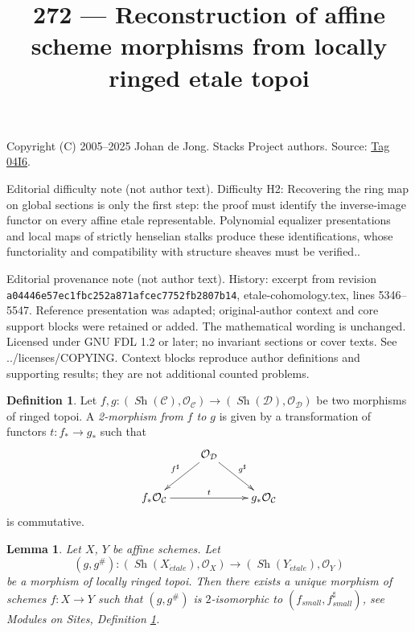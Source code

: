 \documentclass{amsart}
\theoremstyle{plain}
\newtheorem{lemma}[subsection]{Lemma}
\theoremstyle{definition}
\newtheorem{definition}[subsection]{Definition}
\theoremstyle{remark}
\numberwithin{equation}{subsection}
\def\Sh{\mathop{\mathit{Sh}}\nolimits}
\def\etale{{\acute{e}tale}}
\begin{document}
\title[Stacks Project, Tag 04I6]{272 --- Reconstruction of affine scheme morphisms from locally ringed etale topoi}
\maketitle
\noindent Copyright (C) 2005--2025 Johan de Jong. Stacks Project authors. Source: \href{https://stacks.math.columbia.edu/tag/04I6}{Tag 04I6}.

\noindent Editorial difficulty note (not author text). Difficulty H2: Recovering the ring map on global sections is only the first step: the proof must identify the inverse-image functor on every affine etale representable. Polynomial equalizer presentations and local maps of strictly henselian stalks produce these identifications, whose functoriality and compatibility with structure sheaves must be verified..

\noindent Editorial provenance note (not author text). History: excerpt from revision \texttt{a0444\allowbreak 6e57e\allowbreak c1fbc\allowbreak 252a8\allowbreak 71afc\allowbreak ec775\allowbreak 2fb28\allowbreak 07b14}, etale-cohomology.tex, lines 5346--5547. Reference presentation was adapted; original-author context and core support blocks were retained or added. The mathematical wording is unchanged. Licensed under GNU FDL 1.2 or later; no invariant sections or cover texts. See ../licenses/COPYING. Context blocks reproduce author definitions and supporting results; they are not additional counted problems.

\begin{definition}
\label{sites-modules-definition-2-morphism-ringed-topoi}
Let
$f, g :
(\Sh(\mathcal{C}), \mathcal{O}_\mathcal{C})
\to
(\Sh(\mathcal{D}), \mathcal{O}_\mathcal{D})$
be two morphisms of ringed topoi. A {\it 2-morphism from $f$ to $g$}
is given by a transformation of functors $t : f_* \to g_*$ such that
$$
\xymatrix{
& \mathcal{O}_\mathcal{D}
\ar[ld]_{f^\sharp}
\ar[rd]^{g^\sharp} \\
f_*\mathcal{O}_\mathcal{C} \ar[rr]^t & &
g_*\mathcal{O}_\mathcal{C}
}
$$
is commutative.
\end{definition}

\begin{lemma}
\label{lemma-morphism-ringed-etale-topoi-affines}
Let $X$, $Y$ be affine schemes.
Let
$$
(g, g^\#) :
(\Sh(X_\etale), \mathcal{O}_X)
\longrightarrow
(\Sh(Y_\etale), \mathcal{O}_Y)
$$
be a morphism of locally ringed topoi. Then there exists a
unique morphism of schemes $f : X \to Y$ such that
$(g, g^\#)$ is $2$-isomorphic to $(f_{small}, f_{small}^\sharp)$,
see
Modules on Sites,
Definition \ref{sites-modules-definition-2-morphism-ringed-topoi}.
\end{lemma}
\end{document}
